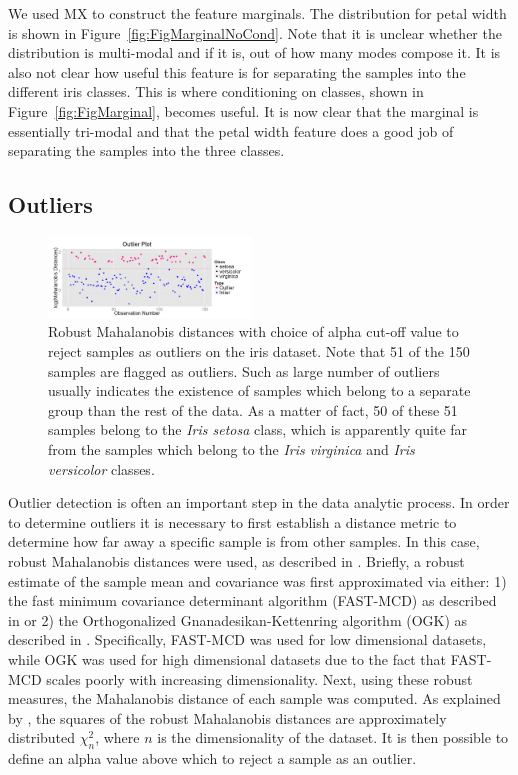 \documentclass[twoside,leqno,twocolumn]{article}
\begin{document}
We used MX to construct the feature marginals. The distribution for petal width is shown in Figure~\ref{fig:FigMarginalNoCond}. Note that it is unclear whether the distribution is multi-modal and if it is, out of how many modes compose it. It is also not clear how useful this feature is for separating the samples into the different iris classes. This is where conditioning on classes, shown in Figure~\ref{fig:FigMarginal}, becomes useful. It is now clear that the marginal is essentially tri-modal and that the petal width feature does a good job of separating the samples into the three classes.

\subsection{Outliers}
\label{subsec:SubSecOutliers}

\begin{figure}[t!]
	\centering
	\includegraphics[width=0.48\textwidth]{Figures/Iris/OutliersIris.png}
	\caption{Robust Mahalanobis distances with choice of alpha cut-off value to reject samples as outliers on the iris dataset. Note that 51 of the 150 samples are flagged as outliers. Such as large number of outliers usually indicates the existence of samples which belong to a separate group than the rest of the data. As a matter of fact, 50 of these 51 samples belong to the \textit{Iris setosa} class, which is apparently quite far from the samples which belong to the \textit{Iris virginica} and \textit{Iris versicolor} classes.}
	\label{fig:FigOutliers}
\end{figure}

Outlier detection is often an important step in the data analytic process. In order to determine outliers it is necessary to first establish a distance metric to determine how far away a specific sample is from other samples. In this case, robust Mahalanobis distances were used, as described in \cite{hubert2008high}. Briefly, a robust estimate of the sample mean and covariance was first approximated via either: 1) the fast minimum covariance determinant algorithm (FAST-MCD) as described in \cite{rousseeuw1999fast} or 2) the Orthogonalized Gnanadesikan-Kettenring algorithm (OGK) as described in \cite{maronna2002robust}. Specifically, FAST-MCD was used for low dimensional datasets, while OGK was used for high dimensional datasets due to the fact that FAST-MCD scales poorly with increasing dimensionality. Next, using these robust measures, the Mahalanobis distance of each sample was computed. As explained by \cite{hardin2012distribution}, the squares of the robust Mahalanobis distances are approximately distributed $\chi^2_n$, where $n$ is the dimensionality of the dataset. It is then possible to define an alpha value above which to reject a sample as an outlier. 
\end{document}
